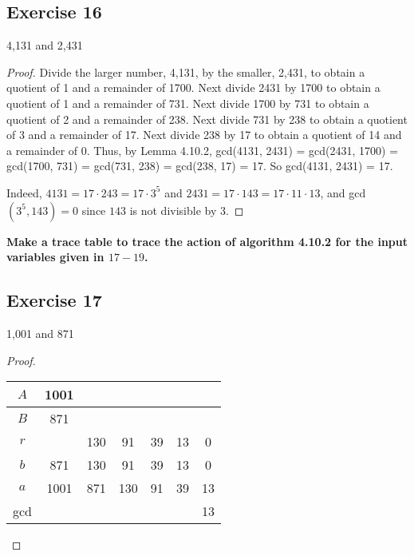 \documentclass[14pt]{extarticle}
\newcommand{\cy}{\color{cyan}}
\begin{document}
\subsection{Exercise 16}
4,131 and 2,431

\begin{proof}
    Divide the larger number, 4,131, by the smaller, 2,431, to obtain a quotient of 1 and a remainder of 1700. Next divide 2431 by 1700 to obtain a quotient of 1 and a remainder of 731. Next divide 1700 by 731 to obtain a quotient of 2 and a remainder of 238. Next divide 731 by 238 to obtain a quotient of 3 and a remainder of 17. Next divide 238 by 17 to obtain a quotient of 14 and a remainder of 0. Thus, by Lemma 4.10.2, gcd(4131, 2431) = gcd(2431, 1700) = gcd(1700, 731) = gcd(731, 238) = gcd(238, 17) = 17. So gcd(4131, 2431) = 17.

    Indeed, $4131 = 17 \cdot 243 = 17 \cdot 3^5$ and $2431 = 17 \cdot 143 = 17 \cdot 11 \cdot 13$, and gcd$(3^5, 143) = 0$ since $143$ is not divisible by 3.
\end{proof}

{\bf \cy Make a trace table to trace the action of algorithm 4.10.2 for the input variables given in $17-19$.}

\subsection{Exercise 17}
1,001 and 871

\begin{proof}
    \begin{center}
        \begin{tabular}{|c|c|c|c|c|c|c|}
            \hline
            $A$ & 1001 &     &     &    &    &    \\
            \hline
            $B$ & 871  &     &     &    &    &    \\
            \hline
            $r$ &      & 130 & 91  & 39 & 13 & 0  \\
            \hline
            $b$ & 871  & 130 & 91  & 39 & 13 & 0  \\
            \hline
            $a$ & 1001 & 871 & 130 & 91 & 39 & 13 \\
            \hline
            gcd &      &     &     &    &    & 13 \\
            \hline
        \end{tabular}
    \end{center}
\end{proof}
\end{document}
